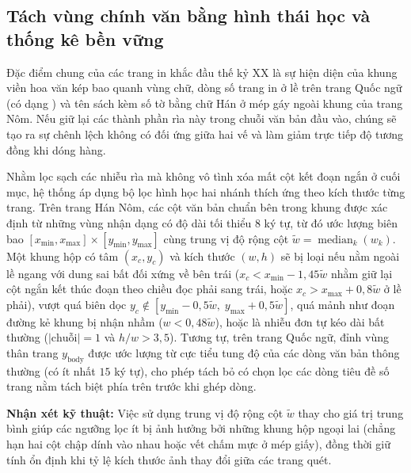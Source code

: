 \subsection{Tách vùng chính văn bằng hình thái học và thống kê bền vững}

Đặc điểm chung của các trang in khắc đầu thế kỷ XX là sự hiện diện của khung viền hoa văn kép bao quanh vùng chữ, dòng số trang in ở lề trên trang Quốc ngữ (có dạng ) và tên sách kèm số tờ bằng chữ Hán ở mép gáy ngoài khung của trang Nôm. Nếu giữ lại các thành phần rìa này trong chuỗi văn bản đầu vào, chúng sẽ tạo ra sự chênh lệch không có đối ứng giữa hai vế và làm giảm trực tiếp độ tương đồng khi dóng hàng.

Nhằm lọc sạch các nhiễu rìa mà không vô tình xóa mất cột kết đoạn ngắn ở cuối mục, hệ thống áp dụng bộ lọc hình học hai nhánh thích ứng theo kích thước từng trang. Trên trang Hán Nôm, các cột văn bản chuẩn bên trong khung được xác định từ những vùng nhận dạng có độ dài tối thiểu $8$ ký tự, từ đó ước lượng biên bao $[x_{\min}, x_{\max}] \times [y_{\min}, y_{\max}]$ cùng trung vị độ rộng cột $\tilde{w} = \operatorname{median}_k(w_k)$. Một khung hộp có tâm $(x_c, y_c)$ và kích thước $(w, h)$ sẽ bị loại nếu nằm ngoài lề ngang với dung sai bất đối xứng về bên trái ($x_c < x_{\min} - 1{,}45\tilde{w}$ nhằm giữ lại cột ngắn kết thúc đoạn theo chiều đọc phải sang trái, hoặc $x_c > x_{\max} + 0{,}8\tilde{w}$ ở lề phải), vượt quá biên dọc $y_c \notin [y_{\min} - 0{,}5\tilde{w},\; y_{\max} + 0{,}5\tilde{w}]$, quá mảnh như đoạn đường kẻ khung bị nhận nhầm ($w < 0{,}48\tilde{w}$), hoặc là nhiễu đơn tự kéo dài bất thường ($|\text{chuỗi}| = 1$ và $h / w > 3{,}5$). Tương tự, trên trang Quốc ngữ, đỉnh vùng thân trang $y_{\text{body}}$ được ước lượng từ cực tiểu tung độ của các dòng văn bản thông thường (có ít nhất $15$ ký tự), cho phép tách bỏ có chọn lọc các dòng tiêu đề số trang nằm tách biệt phía trên trước khi ghép dòng.

\begin{softbox}
\textbf{Nhận xét kỹ thuật:} Việc sử dụng trung vị độ rộng cột $\tilde{w}$ thay cho giá trị trung bình giúp các ngưỡng lọc ít bị ảnh hưởng bởi những khung hộp ngoại lai (chẳng hạn hai cột chập dính vào nhau hoặc vết chấm mực ở mép giấy), đồng thời giữ tính ổn định khi tỷ lệ kích thước ảnh thay đổi giữa các trang quét.
\end{softbox}
